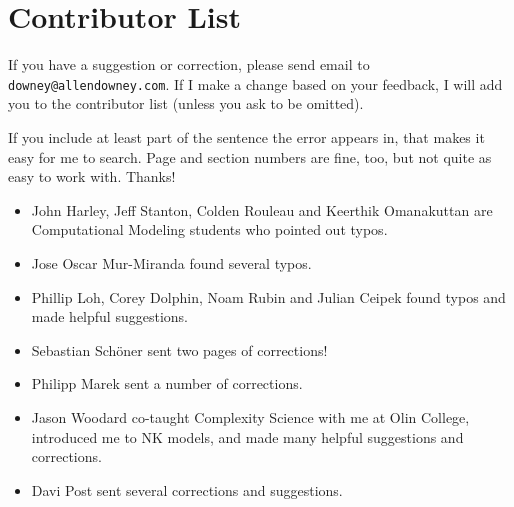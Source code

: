 \documentclass[12pt]{book}
\theoremstyle{exercise}
\begin{document}
\section*{Contributor List}


If you have a suggestion or correction, please send email to
{\tt downey@allendowney.com}.  If I make a change based on your
feedback, I will add you to the contributor list
(unless you ask to be omitted).

If you include at least part of the sentence the
error appears in, that makes it easy for me to search.  Page and
section numbers are fine, too, but not quite as easy to work with.
Thanks!

\small

\begin{itemize}

\item John Harley, Jeff Stanton, Colden Rouleau and
Keerthik Omanakuttan are Computational Modeling students who
pointed out typos.

\item Jose Oscar Mur-Miranda found several typos.

\item Phillip Loh, Corey Dolphin, Noam Rubin and Julian Ceipek
found typos and made helpful suggestions.


\item Sebastian Sch\"{o}ner sent two pages of corrections!

\item Philipp Marek sent a number of corrections.

\item Jason Woodard co-taught Complexity Science with me at Olin College, introduced me to NK models, and made many helpful suggestions and corrections.

\item Davi Post sent several corrections and suggestions.


\end{itemize}
\end{document}
